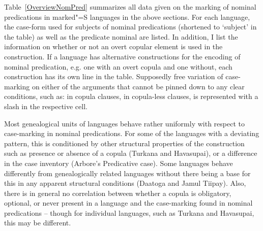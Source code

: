 Table~\ref{OverviewNomPred} summarizes all data given on the marking of nominal predications in marked"=S languages in the above sections. 
For each language, the case-form used for subjects of nominal predications (shortened to `subject' in the table) as well as the predicate nominal are listed.
In addition, I list the information on whether or not an overt copular element is used in the construction. 
If a language has alternative constructions for the encoding of nominal predication, e.g. one with an overt copula and one without, each construction has its own line in the table. 
Supposedly free variation of case-marking on either of the arguments that cannot be pinned down to any clear conditions, such as: \nom{} in copula clauses, \acc{} in copula-less clauses, is represented with a slash in the respective cell. 

Most genealogical units of languages behave rather uniformly with respect to case-marking in nominal predications. 
For some of the languages with a deviating pattern, this is conditioned by other structural properties of the construction such as presence or absence of a copula (Turkana and Havasupai), or a difference in the case inventory (Arbore's Predicative case). 
Some languages behave differently from genealogically related languages without there being a base for this in any apparent structural conditions (Daatoga and Jamul Tiipay). 
Also, there is in general no correlation between whether a copula is obligatory, optional, or never present in a language and the case-marking found in nominal predications -- though for individual languages, such as Turkana and Havasupai, this may be different.  

